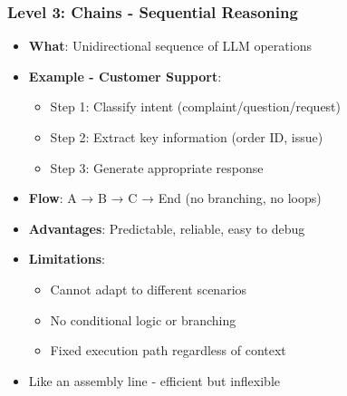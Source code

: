 \begin{frame}[fragile]\frametitle{Level 3: Chains - Sequential Reasoning}
      \begin{itemize}
        \item \textbf{What}: Unidirectional sequence of LLM operations
        \item \textbf{Example - Customer Support}:
        \begin{itemize}
            \item Step 1: Classify intent (complaint/question/request)
            \item Step 2: Extract key information (order ID, issue)
            \item Step 3: Generate appropriate response
        \end{itemize}
        \item \textbf{Flow}: A → B → C → End (no branching, no loops)
        \item \textbf{Advantages}: Predictable, reliable, easy to debug
        \item \textbf{Limitations}: 
        \begin{itemize}
            \item Cannot adapt to different scenarios
            \item No conditional logic or branching
            \item Fixed execution path regardless of context
        \end{itemize}
        \item Like an assembly line - efficient but inflexible
      \end{itemize}
\end{frame}

